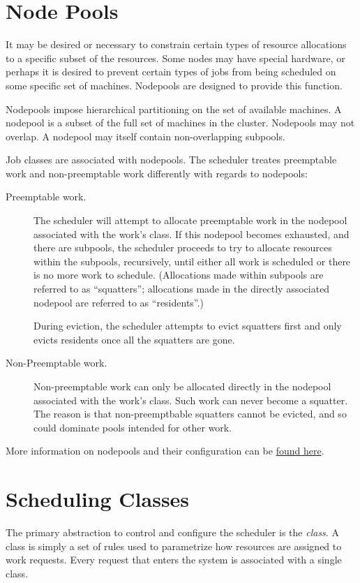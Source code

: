     \section{Node Pools}
    It may be desired or necessary to constrain certain types of resource allocations to a specific
    subset of the resources. Some nodes may have special hardware, or perhaps it is desired to
    prevent certain types of jobs from being scheduled on some specific set of machines. Nodepools
    are designed to provide this function.

    Nodepools impose hierarchical partitioning on the set of available machines. A nodepool is a
    subset of the full set of machines in the cluster. Nodepools may not overlap. A nodepool may
    itself contain non-overlapping subpools. 

    Job classes are associated with nodepools.  The scheduler treates preemptable work and
    non-preemptable work differently with regards to nodepools:
    \begin{description}
      \item[Preemptable work.] The scheduler will attempt to allocate preemptable work in
        the nodepool associated with the work's class.  If this nodepool becomes exhausted,
        and there are subpools, the scheduler proceeds to try to allocate resources within
        the subpools, recursively, until either all work is scheduled or there is no more
        work to schedule.  (Allocations made within subpools are referred to as ``squatters'';
        allocations made in the directly associated nodepool are referred to as ``residents''.)

        During eviction, the scheduler attempts to evict squatters first and only evicts
        residents once all the squatters are gone.
        
      \item[Non-Preemptable work.]  Non-preemptable work can only be allocated directly
        in the nodepool associated with the work's class.  Such work can never become a
        squatter.  The reason is that non-preemptbable squatters cannot be evicted, and so
        could dominate pools intended for other work.
     \end{description}    
    
    More information on nodepools and their configuration can be \hyperref[subsec:nodepools]{found here}.

    \section{Scheduling Classes}
    \label{sec:rm.job-classes}
    The primary abstraction to control and configure the scheduler is the {\em class}. A class is simply a set 
    of rules used to parametrize how resources are assigned to work requests. Every request that enters the system is 
    associated with a single class. 
    
